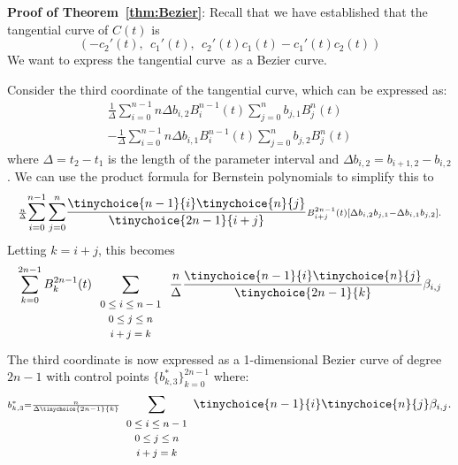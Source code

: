 \documentclass[10pt,twocolumn]{article}
\newif\ifJournal
\newcommand{\tang}{tangential curve\ }
\begin{document}
{\bf Proof of Theorem~\ref{thm:Bezier}}:
Recall that we have established that the tangential curve of $C(t)$ is 
\begin{equation}
\label{eq:dual2}
  (-c_2'(t),\ \  c_1'(t),\ \ c_2'(t) c_1(t) - c_1'(t)c_2(t))
\end{equation}
We want to express the \tang as a Bezier curve.
\ifJournal
Distinguish the two $\Delta$'s!  One is parameter length and other
is difference of control points.
\fi
Consider the third coordinate of the tangential curve,
which can be expressed as: 
\[
\begin{array}{l}
\scriptstyle{\frac{1}{\Delta}}
\displaystyle{\sum_{i=0}^{n-1}} \scriptstyle{n \Delta b_{i,2} B_i^{n-1}(t)}
 \displaystyle{\sum_{j=0}^n}     \scriptstyle{         b_{j,1} B_j^n(t)} \\
  - 
\scriptstyle{\frac{1}{\Delta}}
 \displaystyle{\sum_{i=0}^{n-1}} \scriptstyle{n \Delta b_{i,1} B_i^{n-1}(t)}
 \displaystyle{\sum_{j=0}^n}	 \scriptstyle{         b_{j,2} B_j^n(t)}
\end{array}
\]
where $\Delta = t_2 - t_1$ is the length of the parameter interval
and $\Delta b_{i,2} = b_{i+1,2} - b_{i,2}$.
We can use the product formula
for Bernstein polynomials \cite{farin97} to simplify this to
\[
\scriptstyle{\frac{n}{\Delta}}
\displaystyle{\sum_{i=0}^{n-1} \sum_{j=0}^n }
\frac{\tinychoice{n-1}{i} \tinychoice{n}{j}}{ \tinychoice{2n-1}{i+j} } 
\scriptstyle{ B_{i+j}^{2n-1}(t) [ \Delta b_{i,2} b_{j,1} - \Delta b_{i,1} b_{j,2} ]}.
\]
Letting $k=i+j$, this becomes
\[
\sum_{k=0}^{2n-1} B_k^{2n-1}(t) 
\sum_{\begin{array}{c} \mbox{\footnotesize{$0 \leq i \leq n-1$}} \\ 
			     \mbox{\footnotesize{$0 \leq j \leq n$}} \\ 
			     \mbox{\footnotesize{$i+j=k$}}
			     \end{array}}
\frac{n}{\Delta} \frac{ \tinychoice{n-1}{i} \tinychoice{n}{j} }{ \tinychoice{2n-1}{k} }
\beta_{i,j}
\]
The third coordinate is now expressed as a 1-dimensional Bezier curve of 
degree $2n-1$ with control points $\{b^*_{k,3} \}_{k=0}^{2n-1}$ where:
\begin{equation}
\label{eq:dualw2}
\scriptstyle{
b^*_{k,3} = \frac{n}{\Delta \tinychoice{2n-1}{k}}
\displaystyle{\sum_{\begin{array}{c} \mbox{\footnotesize{$0 \leq i \leq n-1$}} \\ 
			     \mbox{\footnotesize{$0 \leq j \leq n$}} \\ 
			     \mbox{\footnotesize{$i+j=k$}}
			     \end{array}}}
\tinychoice{n-1}{i} \tinychoice{n}{j} \beta_{i,j}.
}
\end{equation}
\end{document}

